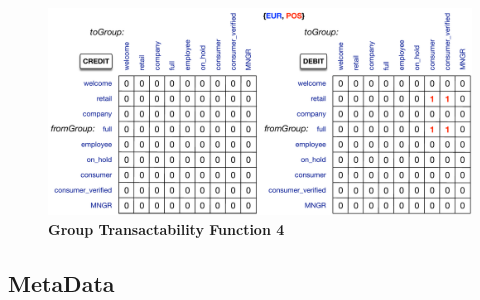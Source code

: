 \begin{figure}[H]
\centering
\includegraphics[width=17cm]{Figures/GTF4}
\caption{\small\textbf{Group Transactability Function 4}}
\label{fig:GTF4}
\end{figure}


\subsection{MetaData}



